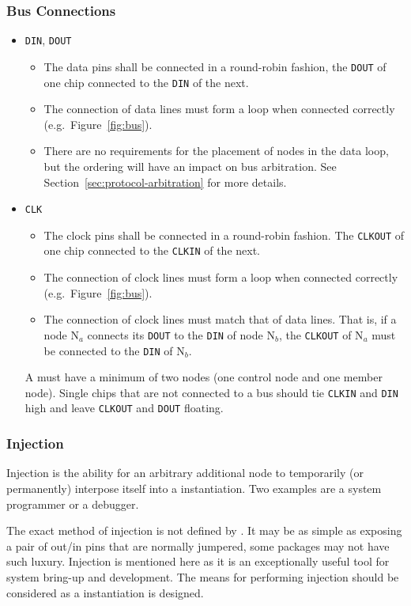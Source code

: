 \subsubsection{Bus Connections}
\label{sec:physical-bus}
\begin{itemize}
  \item {\tt DIN}, {\tt DOUT}
  \begin{itemize}
    \item The data pins shall be connected in a round-robin fashion, the
      {\tt DOUT} of one chip connected to the {\tt DIN} of the next.
    \item The connection of data lines must form a loop when connected
      correctly (e.g.~Figure~\ref{fig:bus}).
    \item There are no requirements for the placement of nodes in the data
      loop, but the ordering will have an impact on bus arbitration. See
      Section~\ref{sec:protocol-arbitration} for more details.
  \end{itemize}
  \item {\tt CLK}
  \begin{itemize}
    \item The clock pins shall be connected in a round-robin fashion. The
      {\tt CLKOUT} of one chip connected to the {\tt CLKIN} of the next.
    \item The connection of clock lines must form a loop when connected
      correctly (e.g.~Figure~\ref{fig:bus}).
    \item The connection of clock lines must match that of data lines. That
      is, if a node N$_{a}$ connects its {\tt DOUT} to the {\tt DIN} of node
      N$_{b}$, the {\tt CLKOUT} of N$_{a}$ must be connected to the {\tt DIN}
      of N$_{b}$.
  \end{itemize}
  A \bus must have a minimum of two nodes (one control node and one
  member node). Single chips that are not connected to a bus should tie
  {\tt CLKIN} and {\tt DIN} high and leave {\tt CLKOUT} and {\tt DOUT}
  floating.
\end{itemize}


\subsubsection{Injection}
Injection is the ability for an arbitrary additional node to temporarily (or
permanently) interpose itself into a \bus instantiation. Two examples are a
system programmer or a debugger.

The exact method of injection is not defined by \bus. It may be as simple as
exposing a pair of out/in pins that are normally jumpered, some packages may
not have such luxury. Injection is mentioned here as it is an exceptionally
useful tool for system bring-up and development. The means for performing
injection should be considered as a \bus instantiation is designed.

